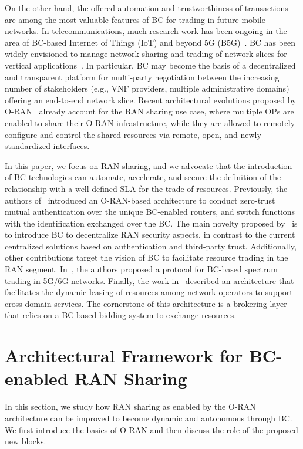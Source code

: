 \documentclass[journal]{IEEEtran}
\begin{document}
On the other hand, the offered automation and trustworthiness of transactions are among the most valuable features of BC for trading in future mobile networks. In telecommunications, much research work has been ongoing in the area of BC-based Internet of Things (IoT) and beyond 5G (B5G)~\cite{nguyen2020blockchain}. BC has been widely envisioned to manage network sharing and trading of network slices for vertical applications~\cite{xu2020blockchain}. In particular, BC may become the basis of a decentralized and transparent platform for multi-party negotiation between the increasing number of stakeholders (e.g., VNF providers, multiple administrative domains) offering an end-to-end network slice. Recent architectural evolutions proposed by O-RAN~\cite{ORAN} already account for the RAN sharing use case, where multiple OPs are enabled to share their O-RAN infrastructure, while they are allowed to remotely configure and control the shared resources via remote, open, and newly standardized interfaces.   

In this paper, we focus on RAN sharing, and we advocate that the introduction of BC technologies can automate, accelerate, and secure the definition of the relationship with a well-defined SLA for the trade of resources. Previously, the authors of~\cite{xu2021ran} introduced an O-RAN-based architecture to conduct zero-trust mutual authentication over the unique BC-enabled routers, and switch functions with the identification exchanged over the BC. The main novelty proposed by~\cite{xu2021ran} is to introduce BC to decentralize RAN security aspects, in contrast to the current centralized solutions based on authentication and third-party trust. Additionally, other contributions target the vision of BC to facilitate resource trading in the RAN segment. In~\cite{maksymyuk2020blockchain}, the authors proposed a protocol for BC-based spectrum trading in 5G/6G networks. Finally, the work in~\cite{togou2020dbns} described an architecture that facilitates the dynamic leasing of resources among network operators to support cross-domain services. The cornerstone of this architecture is a brokering layer that relies on a BC-based bidding system to exchange resources.

\section{Architectural Framework for BC-enabled RAN Sharing}
\label{section:architecture}
In this section, we study how RAN sharing as enabled by the O-RAN architecture can be improved to become dynamic and autonomous through BC. We first introduce the basics of O-RAN and then discuss the role of the proposed new blocks.
\end{document}
